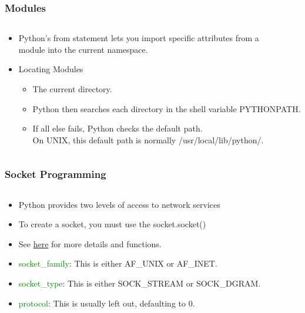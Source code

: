 \begin{frame}
	\frametitle{Modules}
	\begin{columns}[c]
		\begin{column}{30cm}
			\vspace{.1cm}
			\begin{itemize}
				\justifying
				\item Python's from statement lets you import specific attributes from a \\
				 module into the current namespace.
				\item Locating Modules
				\begin{itemize}
					\item The current directory.
					\item Python then searches each directory in the shell variable PYTHONPATH.
					\item If all else fails, Python checks the default path. \\
					On UNIX, this default path is normally /usr/local/lib/python/.
				\end{itemize}
			\end{itemize}
		\end{column}
	\end{columns}
\end{frame}

\begin{frame}[fragile]
	\frametitle{Socket Programming}
	\begin{columns}[c]
		\begin{column}{30cm}
			\vspace{.1cm}
			\begin{itemize}
				\justifying
				\item Python provides two levels of access to network services
				\item To create a socket, you must use the socket.socket()
				\item See
				\textcolor{blue}{\href{https://docs.python.org/3.0/library/socket.html}{here}}
				for more details and functions.
				\item \textcolor{green}{socket\_family}: This is either AF\_UNIX or AF\_INET.
				\item \textcolor{green}{socket\_type}: This is either SOCK\_STREAM or SOCK\_DGRAM.
				\item \textcolor{green}{protocol}: This is usually left out, defaulting to 0.
			\end{itemize}
		\end{column}
	\end{columns}
\end{frame}

